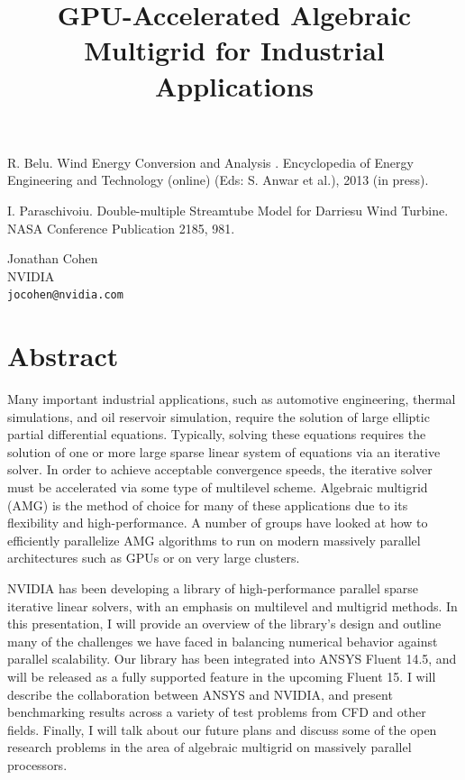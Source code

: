 \documentclass[article,A4,11pt]{llncs}%
\begin{document}

\begin{thebibliography}{10}
{\sc R. Belu}. {Wind Energy Conversion and Analysis }. Encyclopedia of Energy Engineering and Technology (online) (Eds: S. Anwar et al.), 2013 (in press).

{\sc I. Paraschivoiu}. {Double-multiple Streamtube Model for Darriesu Wind Turbine}. NASA Conference Publication 2185, 981.
\end{thebibliography}

\title{GPU-Accelerated Algebraic Multigrid for Industrial Applications}
 \author{} \institute{}
\maketitle
\begin{center}
{\large Jonathan Cohen}\\
NVIDIA\\
{\tt jocohen@nvidia.com}
\end{center}

\section*{Abstract}
Many important industrial applications, such as automotive engineering, thermal simulations, and oil reservoir simulation, require the solution of large elliptic partial differential equations.  Typically, solving these equations requires the solution of one or more large sparse linear system of equations via an iterative solver.  In order to achieve acceptable convergence speeds, the iterative solver must be accelerated via some type of multilevel scheme.  Algebraic multigrid (AMG) is the method of choice for many of these applications due to its flexibility and high-performance.  A number of groups have looked at how to efficiently parallelize AMG algorithms to run on modern massively parallel architectures such as GPUs or on very large clusters.

NVIDIA has been developing a library of high-performance parallel sparse iterative linear solvers, with an emphasis on multilevel and multigrid methods.  In this presentation, I will provide an overview of the library’s design and outline many of the challenges we have faced in balancing numerical behavior against parallel scalability.  Our library has been integrated into ANSYS Fluent 14.5, and will be released as a fully supported feature in the upcoming Fluent 15.  I will describe the collaboration between ANSYS and NVIDIA, and present benchmarking results across a variety of test problems from CFD and other fields.  Finally, I will talk about our future plans and discuss some of the open research problems in the area of algebraic multigrid on massively parallel processors.
\end{document}
